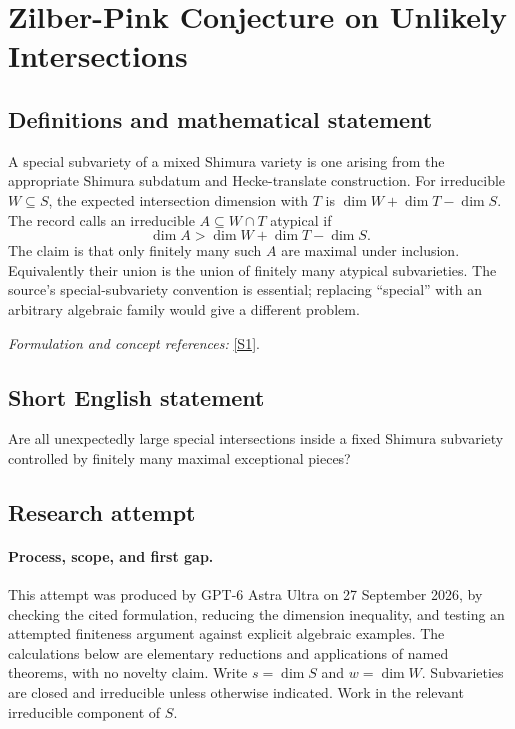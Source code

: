 \documentclass[11pt]{article}
\begin{document}
\section*{\texorpdfstring{Zilber-Pink Conjecture on Unlikely Intersections}{Zilber-Pink Conjecture on Unlikely Intersections}}\label{82}
\subsection{Definitions and mathematical statement}
A special subvariety of a mixed Shimura variety is one arising from the appropriate Shimura subdatum and Hecke-translate construction. For irreducible $W\subseteq S$, the expected intersection dimension with $T$ is $\dim W+\dim T-\dim S$. The record calls an irreducible $A\subseteq W\cap T$ atypical if
\[
 \dim A>\dim W+\dim T-\dim S.
\]
The claim is that only finitely many such $A$ are maximal under inclusion. Equivalently their union is the union of finitely many atypical subvarieties. The source's special-subvariety convention is essential; replacing ``special'' with an arbitrary algebraic family would give a different problem.
\par\smallskip\textit{Formulation and concept references:} \href{https://ems.press/content/serial-article-files/52570}{[S1]}.

\subsection{Short English statement}
Are all unexpectedly large special intersections inside a fixed Shimura subvariety controlled by finitely many maximal exceptional pieces?
\subsection{Research attempt}
\paragraph{Process, scope, and first gap.}
This attempt was produced by GPT-6 Astra Ultra on 27 September 2026, by checking the cited formulation, reducing the dimension inequality, and testing an attempted finiteness argument against explicit algebraic examples. The calculations below are elementary reductions and applications of named theorems, with no novelty claim. Write $s=\dim S$ and $w=\dim W$. Subvarieties are closed and irreducible unless otherwise indicated. Work in the relevant irreducible component of $S$.
\end{document}
